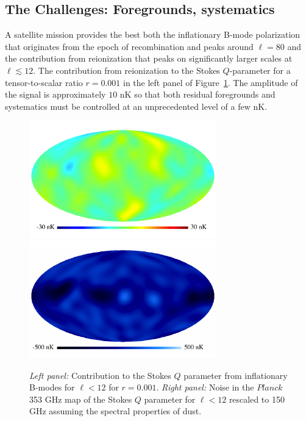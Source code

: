 \subsection{The Challenges: Foregrounds, systematics}
\label{sec:foregrounds}
\vspace{-0.05in}

A satellite mission provides the best  both the inflationary B-mode polarization that originates from the epoch of recombination and peaks around $\ell=80$ and the contribution from reionization that peaks on significantly larger scales at $\ell\lesssim 12$. The contribution from reionization to the Stokes $Q$-parameter for a tensor-to-scalar ratio $r=0.001$ in the left panel of Figure~\ref{fig:Qrp001}. The amplitude of the signal is approximately $10$ nK so that both residual foregrounds and systematics must be controlled at an unprecedented level of a few nK.

\begin{figure}[h]
\begin{center}
\includegraphics[width=3.2in]{Figures/P15_2_12_rp001.pdf}
\includegraphics[width=3.2in]{Figures/P353_N_2_12.pdf}
\end{center}
\caption{{\it Left panel:} Contribution to the Stokes $Q$ parameter from inflationary B-modes for $\ell<12$ for $r=0.001$. {\it Right panel:} Noise in the $Planck$ 353 GHz map of the Stokes $Q$ parameter for $\ell<12$ rescaled to 150 GHz assuming the spectral properties of dust.}
\label{fig:Qrp001}
\end{figure}

